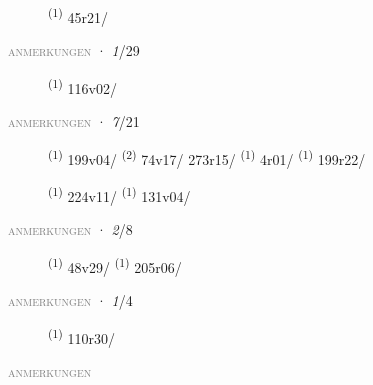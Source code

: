 \begin{description}
    \item[]  \textsuperscript{(1)} \mbox{45r21/}
\end{description}
\textsc{\textcolor{gray}{anmerkungen}}
\ENTRYEND
\noindent{} · \textit{1}/29 \LEMMALINE
\begin{description}
    \item[]  \textsuperscript{(1)} \mbox{116v02/}
\end{description}
\textsc{\textcolor{gray}{anmerkungen}}
\ENTRYEND
\noindent{} · \textit{7}/21 \LEMMALINE
\begin{description}
    \item[]  \textsuperscript{(1)} \mbox{199v04/} \CASEBREAK {} \textsuperscript{(2)} \mbox{74v17/} \mbox{273r15/} \CASEBREAK {} \textsuperscript{(1)} \mbox{4r01/} \textsuperscript{(1)} \mbox{199r22/}
    \item[]  \textsuperscript{(1)} \mbox{224v11/} \CASEBREAK {} \textsuperscript{(1)} \mbox{131v04/}
\end{description}
\textsc{\textcolor{gray}{anmerkungen}}
\ENTRYEND
\noindent{} · \textit{2}/8 \LEMMALINE
\begin{description}
    \item[]  \textsuperscript{(1)} \mbox{48v29/} \textsuperscript{(1)} \mbox{205r06/}
\end{description}
\textsc{\textcolor{gray}{anmerkungen}}
\ENTRYEND
\noindent{} · \textit{1}/4 \LEMMALINE
\begin{description}
    \item[]  \textsuperscript{(1)} \mbox{110r30/}
\end{description}
\textsc{\textcolor{gray}{anmerkungen}}
\ENTRYEND
